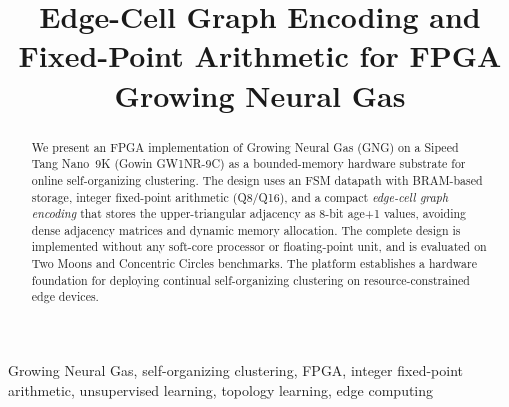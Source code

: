 \documentclass[conference]{IEEEtran}
\begin{document}
\title{Edge-Cell Graph Encoding and Fixed-Point Arithmetic for FPGA Growing Neural Gas}
\author{
}

\maketitle

\begin{abstract}
We present an FPGA implementation of Growing Neural Gas (GNG) on a Sipeed Tang Nano~9K (Gowin GW1NR-9C) as a bounded-memory hardware substrate for online self-organizing clustering. The design uses an FSM datapath with BRAM-based storage, integer fixed-point arithmetic (Q8/Q16), and a compact \emph{edge-cell graph encoding} that stores the upper-triangular adjacency as 8-bit age+1 values, avoiding dense adjacency matrices and dynamic memory allocation. The complete design is implemented without any soft-core processor or floating-point unit, and is evaluated on Two Moons and Concentric Circles benchmarks. The platform establishes a hardware foundation for deploying continual self-organizing clustering on resource-constrained edge devices.
\end{abstract}

\begin{IEEEkeywords}
Growing Neural Gas, self-organizing clustering, FPGA, integer fixed-point arithmetic, unsupervised learning, topology learning, edge computing
\end{IEEEkeywords}
\end{document}

